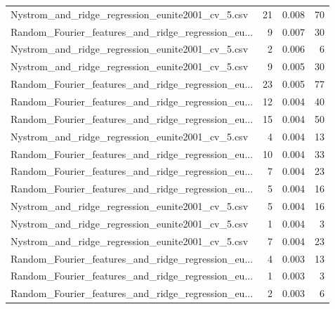 \begin{tabularx}{\textwidth}{lrrr}
  Nystrom\_and\_ridge\_regression\_eunite2001\_cv\_5.csv &       21 &               0.008 &            70 \\
Random\_Fourier\_features\_and\_ridge\_regression\_eu... &        9 &               0.007 &            30 \\
  Nystrom\_and\_ridge\_regression\_eunite2001\_cv\_5.csv &        2 &               0.006 &             6 \\
  Nystrom\_and\_ridge\_regression\_eunite2001\_cv\_5.csv &        9 &               0.005 &            30 \\
Random\_Fourier\_features\_and\_ridge\_regression\_eu... &       23 &               0.005 &            77 \\
Random\_Fourier\_features\_and\_ridge\_regression\_eu... &       12 &               0.004 &            40 \\
Random\_Fourier\_features\_and\_ridge\_regression\_eu... &       15 &               0.004 &            50 \\
  Nystrom\_and\_ridge\_regression\_eunite2001\_cv\_5.csv &        4 &               0.004 &            13 \\
Random\_Fourier\_features\_and\_ridge\_regression\_eu... &       10 &               0.004 &            33 \\
Random\_Fourier\_features\_and\_ridge\_regression\_eu... &        7 &               0.004 &            23 \\
Random\_Fourier\_features\_and\_ridge\_regression\_eu... &        5 &               0.004 &            16 \\
  Nystrom\_and\_ridge\_regression\_eunite2001\_cv\_5.csv &        5 &               0.004 &            16 \\
  Nystrom\_and\_ridge\_regression\_eunite2001\_cv\_5.csv &        1 &               0.004 &             3 \\
  Nystrom\_and\_ridge\_regression\_eunite2001\_cv\_5.csv &        7 &               0.004 &            23 \\
Random\_Fourier\_features\_and\_ridge\_regression\_eu... &        4 &               0.003 &            13 \\
Random\_Fourier\_features\_and\_ridge\_regression\_eu... &        1 &               0.003 &             3 \\
Random\_Fourier\_features\_and\_ridge\_regression\_eu... &        2 &               0.003 &             6 \\
\bottomrule
\end{tabularx}

